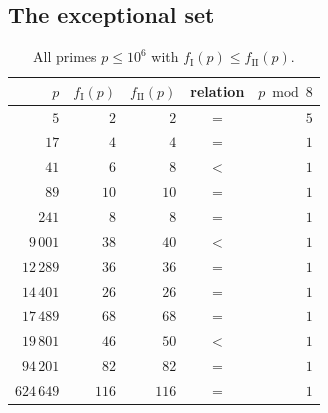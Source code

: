 \documentclass[11pt,reqno]{amsart}
\theoremstyle{plain}
\theoremstyle{definition}
\numberwithin{equation}{section}
\newcommand{\fI}{f_{\mathrm{I}}}
\newcommand{\fII}{f_{\mathrm{II}}}
\begin{document}
\subsection{The exceptional set}

\begin{table}[ht]
\caption{All primes $p\le10^{6}$ with $\fI(p)\le\fII(p)$.}\label{tab:exc}
\begin{tabular}{rrrcr}
\toprule
$p$ & $\fI(p)$ & $\fII(p)$ & relation & $p\bmod 8$\\
\midrule
$5$       & $2$   & $2$   & $=$ & $5$\\
$17$      & $4$   & $4$   & $=$ & $1$\\
$41$      & $6$   & $8$   & $<$ & $1$\\
$89$      & $10$  & $10$  & $=$ & $1$\\
$241$     & $8$   & $8$   & $=$ & $1$\\
$9\,001$  & $38$  & $40$  & $<$ & $1$\\
$12\,289$ & $36$  & $36$  & $=$ & $1$\\
$14\,401$ & $26$  & $26$  & $=$ & $1$\\
$17\,489$ & $68$  & $68$  & $=$ & $1$\\
$19\,801$ & $46$  & $50$  & $<$ & $1$\\
$94\,201$ & $82$  & $82$  & $=$ & $1$\\
$624\,649$& $116$ & $116$ & $=$ & $1$\\
\bottomrule
\end{tabular}
\end{table}
\end{document}
